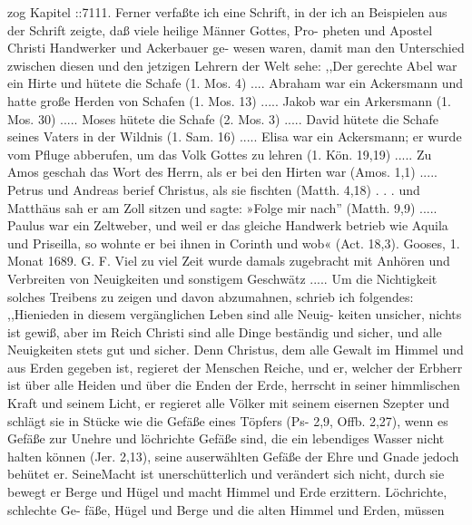 zog Kapitel ::7111.
Ferner verfaßte ich eine Schrift, in der ich an Beispielen
aus der Schrift zeigte, daß viele heilige Männer Gottes, Pro-
pheten und Apostel Christi Handwerker und Ackerbauer ge-
wesen waren, damit man den Unterschied zwischen diesen und den
jetzigen Lehrern der Welt sehe:
,,Der gerechte Abel war ein Hirte und hütete die Schafe
(1. Mos. 4) .... Abraham war ein Ackersmann und hatte
große Herden von Schafen (1. Mos. 13) ..... Jakob war ein
Arkersmann (1. Mos. 30) ..... Moses hütete die Schafe
(2. Mos. 3) ..... David hütete die Schafe seines Vaters in
der Wildnis (1. Sam. 16) ..... Elisa war ein Ackersmann;
er wurde vom Pfluge abberufen, um das Volk Gottes zu lehren
(1. Kön. 19,19) ..... Zu Amos geschah das Wort des Herrn,
als er bei den Hirten war (Amos. 1,1) ..... Petrus und
Andreas berief Christus, als sie fischten (Matth. 4,18) . . . und
Matthäus sah er am Zoll sitzen und sagte: »Folge mir nach''
(Matth. 9,9) ..... Paulus war ein Zeltweber, und weil er
das gleiche Handwerk betrieb wie Aquila und Priseilla, so wohnte
er bei ihnen in Corinth und wob« (Act. 18,3).
Gooses, 1. Monat 1689. G. F.
Viel zu viel Zeit wurde damals zugebracht mit Anhören und
Verbreiten von Neuigkeiten und sonstigem Geschwätz ..... Um die
Nichtigkeit solches Treibens zu zeigen und davon abzumahnen,
schrieb ich folgendes:
,,Hienieden in diesem vergänglichen Leben sind alle Neuig-
keiten unsicher, nichts ist gewiß, aber im Reich Christi sind alle
Dinge beständig und sicher, und alle Neuigkeiten stets gut und
sicher. Denn Christus, dem alle Gewalt im Himmel und aus
Erden gegeben ist, regieret der Menschen Reiche, und er, welcher
der Erbherr ist über alle Heiden und über die Enden der Erde,
herrscht in seiner himmlischen Kraft und seinem Licht, er regieret
alle Völker mit seinem eisernen Szepter und schlägt sie in Stücke
wie die Gefäße eines Töpfers (Ps- 2,9, Offb. 2,27), wenn es
Gefäße zur Unehre und löchrichte Gefäße sind, die ein lebendiges
Wasser nicht halten können (Jer. 2,13), seine auserwählten Gefäße
der Ehre und Gnade jedoch behütet er. SeineMacht ist unerschütterlich
und verändert sich nicht, durch sie bewegt er Berge und Hügel
und macht Himmel und Erde erzittern. Löchrichte, schlechte Ge-
fäße, Hügel und Berge und die alten Himmel und Erden, müssen


